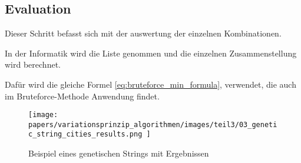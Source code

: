 %
%
%
%
\subsection{Evaluation
\label{genetic_algorithm:evaluation}}
Dieser Schritt befasst sich mit der auswertung der einzelnen 
Kombinationen.

In der Informatik wird die Liste genommen und die einzelnen 
Zusammenstellung wird berechnet.

Dafür wird die gleiche Formel \ref{eq:bruteforce_min_formula}, 
verwendet, die auch im Bruteforce-Methode Anwendung findet.

\begin{figure}
	\centering
	\texttt{[image: 
        papers/variationsprinzip\_algorithmen/images/teil3/03\_genetic\_string\_cities\_results.png
        ]}
	\caption{Beispiel eines genetischen Strings mit Ergebnissen}
	\label{fig:cities_genetic_string_results}
\end{figure}

